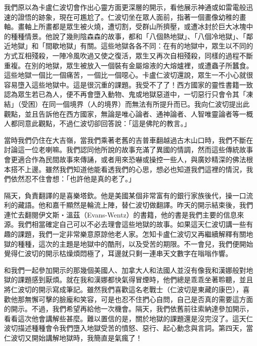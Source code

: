我們原以為卡盧仁波切會作出心靈方面更深層的開示，看他展示神通或如雷電般迅速的證悟的跡象，現在可尷尬了。仁波切坐在眾人面前，指著一個畫像幼稚的畫軸。畫軸上所畫都是眾生被火燒，遭切割，受群山所擠壓，或遭冰封於巨大冰塊中的種種情景。他說了幾則陰森森的故事，都和「八個熱地獄」、「八個冷地獄」、「鄰近地獄」和「間歇地獄」有關。這些地獄各各不同：在有的地獄中，眾生以不同的方式互相殘殺，一陣冷風吹過又使之復活，眾生又再次自相殘殺，同樣的過程不斷重複。在別的地獄，眾生被放入一個裝有金屬熔液的大熔爐裡，或遭蟲子所蠶食。這些地獄一個比一個痛苦，一個比一個噁心。卡盧仁波切還說，眾生一不小心就很容易墮入這些地獄中。這是很沉重的課題。我受不了了！西方國家的靈性書籍一致認為眾生若已為人，便不再會墮入動物、鬼或地獄惡道中，一切惡行只會令其「凍結」（受困）在同一個境界（人的境界）而無法有所提升而已。我向仁波切提出此觀點，並且告訴他在西方國家，無論是唯心論者、通神論者、人智唯靈論者等一概人都同意此觀點，不過仁波切卻回答說：「這是佛陀的教言。」

當時我們仍住在大吉嶺，當我們乘著老舊的吉普車翻越過古木山口時，我們不斷在討論這一位老喇嘛。我們認同他所說的故事充滿了異國的情調，然而這些傳統故事會更適合作為民間故事來傳誦，或者用來恐嚇或操控一些人，與廣妙精深的佛法根本搭不上邊。雖然我們知道他能看透我們的心思，想必也知道我們這裡的情況，我們依然忍不住會想：「也許他是真的老了。」

隔天，負責翻譯的是喜樂塔欽。他是美國某個非常富有的銀行家族後代，操一口流利的藏語。他和嘉千顯然是輪流上陣，替仁波切做翻譯。昨天的開示結束後，我們連忙去翻閱伊文斯‧溫茲（Evans-Wentz）的書籍，他的書是我們主要的信息來源。我們相當確定自己可以不必去理會這些地獄的故事。如果這天仁波切講一些有趣的課題，我們一定非常樂意原諒他老人家。怎知卡盧仁波切又再繼續解釋有關地獄的種種，這次的主題是地獄中的酷刑，以及受苦的期限。不一會兒，我們便開始覺得仁波切的開示枯燥煩悶極了，耳邊就只剩一連串天文數字在嗡嗡作響。

和我們一起參加開示的那幾個美國人、加拿大人和法國人並沒有像我和漢娜般對地獄的課題感到厭煩。就在我和漢娜都快氣得冒煙時，他們總是乖乖坐著聆聽，並且將仁波切的開示寫成筆記。雖然我們喜歡這名老戰士（仁波切是東藏的康巴），喜歡他那無懈可擊的臉龐和笑容，可是也忍不住捫心自問，自己是否真的需要這方面的開示。不過，我們希望再給他一次機會。隔天，我們依舊前往索納達參加開示，看看這次他會講解些甚麼。難以置信的是，關於地獄的課題還是沒完沒了。這天仁波切描述種種會令我們墮入地獄受苦的憤怒、惡行、起心動念與言詞。第四天，當仁波切又開始講解地獄時，我簡直是氣瘋了！

